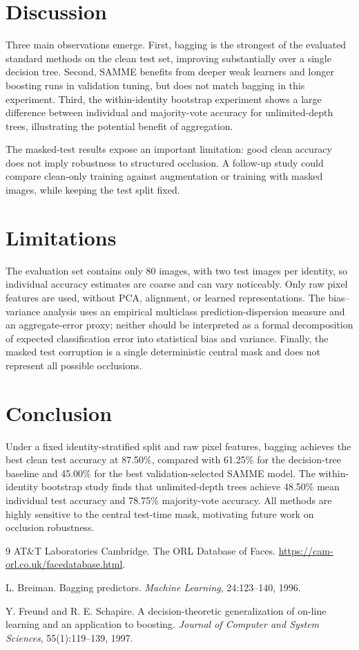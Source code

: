 \documentclass[10pt,twocolumn,letterpaper]{article}
\begin{document}
\section{Discussion}
Three main observations emerge. First, bagging is the strongest of the evaluated standard methods on the clean test set, improving substantially over a single decision tree. Second, SAMME benefits from deeper weak learners and longer boosting runs in validation tuning, but does not match bagging in this experiment. Third, the within-identity bootstrap experiment shows a large difference between individual and majority-vote accuracy for unlimited-depth trees, illustrating the potential benefit of aggregation.

The masked-test results expose an important limitation: good clean accuracy does not imply robustness to structured occlusion. A follow-up study could compare clean-only training against augmentation or training with masked images, while keeping the test split fixed.

\section{Limitations}
The evaluation set contains only 80 images, with two test images per identity, so individual accuracy estimates are coarse and can vary noticeably. Only raw pixel features are used, without PCA, alignment, or learned representations. The bias--variance analysis uses an empirical multiclass prediction-dispersion measure and an aggregate-error proxy; neither should be interpreted as a formal decomposition of expected classification error into statistical bias and variance. Finally, the masked test corruption is a single deterministic central mask and does not represent all possible occlusions.

\section{Conclusion}
Under a fixed identity-stratified split and raw pixel features, bagging achieves the best clean test accuracy at 87.50\%, compared with 61.25\% for the decision-tree baseline and 45.00\% for the best validation-selected SAMME model. The within-identity bootstrap study finds that unlimited-depth trees achieve 48.50\% mean individual test accuracy and 78.75\% majority-vote accuracy. All methods are highly sensitive to the central test-time mask, motivating future work on occlusion robustness.

\begin{thebibliography}{9}
AT\&T Laboratories Cambridge.
\newblock The ORL Database of Faces.
\newblock \url{https://cam-orl.co.uk/facedatabase.html}.

L. Breiman.
\newblock Bagging predictors.
\newblock \emph{Machine Learning}, 24:123--140, 1996.

Y. Freund and R. E. Schapire.
\newblock A decision-theoretic generalization of on-line learning and an application to boosting.
\newblock \emph{Journal of Computer and System Sciences}, 55(1):119--139, 1997.
\end{thebibliography}
\end{document}
